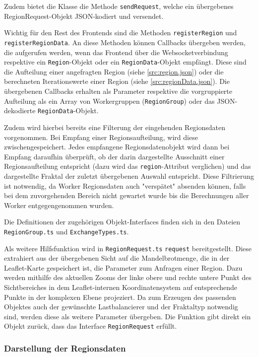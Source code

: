Zudem bietet die Klasse die Methode \texttt{sendRequest}, welche ein übergebenes RegionRequest-Objekt JSON-kodiert und versendet.

Wichtig für den Rest des Frontends sind die Methoden \texttt{registerRegion} und \texttt{registerRegionData}.
An diese Methoden können Callbacks übergeben werden, die aufgerufen werden, wenn das Frontend über die Websocketverbindung
respektive ein \texttt{Region}-Objekt oder ein \texttt{RegionData}-Objekt empfängt.
Diese sind die Aufteilung einer angefragten Region (siehe \autoref{src:region.json})
oder die berechneten Iterationswerte einer Region (siehe \autoref{src:regionData.json}).
Die übergebenen Callbacks erhalten als Parameter respektive die vorgruppierte Aufteilung als ein Array von Workergruppen (\texttt{RegionGroup})
oder das JSON-dekodierte \verb|RegionData|-Objekt.

Zudem wird hierbei bereits eine Filterung der eingehenden Regionsdaten vorgenommen.
Bei Empfang einer Regionsaufteilung, wird diese zwischengespeichert.
Jedes empfangene Regionsdatenobjekt wird dann bei Empfang daraufhin überprüft,
ob der darin dargestellte Ausschnitt einer Regionsaufteilung entspricht (dazu wird das \verb|region|-Attribut verglichen)
und das dargestellte Fraktal der zuletzt übergebenen Auswahl entspricht.
Diese Filtrierung ist notwendig, da Worker Regionsdaten auch "verspätet" absenden können,
falls bei dem zuvorgehenden Bereich nicht gewartet wurde bis die Berechnungen aller Worker entgegengenommen wurden.

Die Definitionen der zugehörigen Objekt-Interfaces finden sich in den Dateien \verb|RegionGroup.ts| und \verb|ExchangeTypes.ts|.

Als weitere Hilfsfunktion wird in \verb|RegionRequest.ts| \verb|request| bereitgestellt.
Diese extrahiert aus der übergebenen Sicht auf die Mandelbrotmenge, die in der Leaflet-Karte gespeichert ist,
die Parameter zum Anfragen einer Region.
Dazu werden mithilfe des aktuellen Zooms der linke obere und rechte untere Punkt des Sichtbereiches
in dem Leaflet-internen Koordinatensystem auf entsprechende Punkte in der komplexen Ebene projeziert.
Da zum Erzeugen des passenden Objektes auch der gewünschte Lastbalancierer und der Fraktaltyp notwendig sind,
werden diese als weitere Parameter übergeben.
Die Funktion gibt direkt ein Objekt zurück, dass das Interface \verb|RegionRequest| erfüllt.

\subsubsection{Darstellung der Regionsdaten} %

